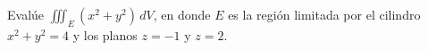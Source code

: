 \item Evalúe $\iiint_E (x^2 + y^2) \, dV$, en donde $E$ es la región limitada por el cilindro $x^2 + y^2 = 4$ y los planos $z = -1$ y $z = 2$.
